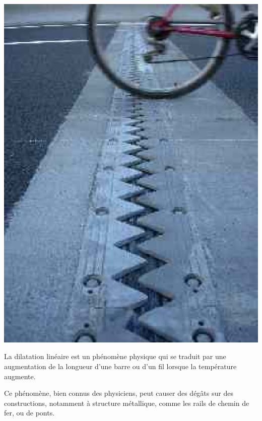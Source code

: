 \documentclass[12pt,french]{book}
\begin{document}

\begin{minipage}{0.3\linewidth}
    \begin{center}
        \includegraphics[scale=0.35]{joint_dilatation_pont.eps}
    \end{center}
\end{minipage}
\begin{minipage}{0.69\linewidth}
    La dilatation linéaire est un phénomène physique qui se traduit par une augmentation de la longueur d'une barre ou d'un fil lorsque la température augmente.\par\smallskip
    Ce phénomène, bien connus des physiciens, peut causer des dégâts sur des constructions, notamment à structure métallique, comme les rails de chemin de fer, ou de ponts.
\end{minipage}\medskip
\end{document}
